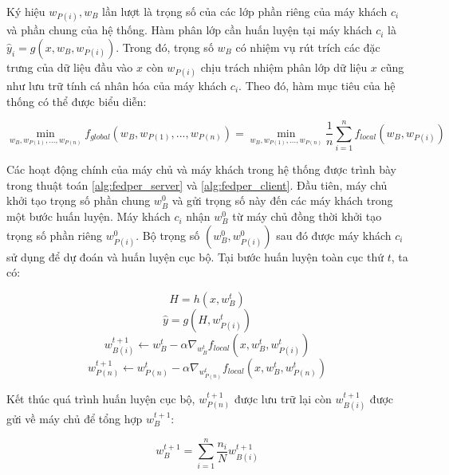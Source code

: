 Ký hiệu $w_{P(i)}, w_B$ lần lượt là trọng số của các lớp phần riêng của máy khách $c_i$ và phần chung của hệ thống. Hàm phân lớp cần huấn luyện tại máy khách $c_i$ là $\hat{y}_i = g(x, w_B, w_{P(i)})$. Trong đó, trọng số $w_B$ có nhiệm vụ rút trích các đặc trưng của dữ liệu đầu vào $x$ còn $w_{P(i)}$ chịu trách nhiệm phân lớp dữ liệu $x$ cũng như lưu trữ tính cá nhân hóa của máy khách $c_i$. Theo đó, hàm mục tiêu của hệ thống có thể được biểu diễn:

\begin{dmath}
    \min_{w_B, w_{P(1)},...,w_{P(n)}} f_{global}(w_B, w_{P(1)},...,w_{P(n)}) = \min_{w_B, w_{P(1)},...,w_{P(n)}} \frac{1}{n} \sum_{i=1}^n f_{local}(w_B, w_{P(i)})
\end{dmath}

Các hoạt động chính của máy chủ và máy khách trong hệ thống được trình bày trong thuật toán \ref{alg:fedper_server} và \ref{alg:fedper_client}. Đầu tiên, máy chủ khởi tạo trọng số phần chung $w_B^0$ và gửi trọng số này đến các máy khách trong một bước huấn luyện. Máy khách $c_i$ nhận $w_B^0$ từ máy chủ đồng thời khởi tạo trọng số phần riêng $w_{P(i)}^0$. Bộ trọng số $(w_B^0, w_{P(i)}^0)$ sau đó được máy khách $c_i$ sử dụng để dự đoán và huấn luyện cục bộ. Tại bước huấn luyện toàn cục thứ $t$, ta có:

\begin{equation}
    H = h(x, w_{B}^t)
\end{equation}
\begin{equation}
    \hat{y} = g(H, w_{P(i)}^t)
\end{equation}
\begin{equation}
    w_{B(i)}^{t+1} \leftarrow w_B^t - \alpha\nabla_{w_B^t} f_{local}(x, w_B^t, w_{P(i)}^t)
\end{equation}
\begin{equation}
    w_{P(n)}^{t+1} \leftarrow w_{P(n)}^t - \alpha\nabla_{w_{P(n)}^t} f_{local}(x, w_B^t, w_{P(n)}^t)
\end{equation}

Kết thúc quá trình huấn luyện cục bộ, $w_{P(n)}^{t+1}$ được lưu trữ lại còn $w_{B(i)}^{t+1}$ được gửi về máy chủ để tổng hợp $w_{B}^{t+1}$:

\begin{equation}
    w_B^{t+1} = \sum_{i=1}^n{\frac{n_i}{N}w_{B(i)}^{t+1}}
\end{equation}


